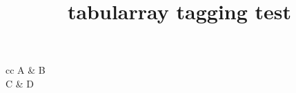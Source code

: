 \documentclass{article}
\title{tabularray tagging test}
\begin{document}
\begin{tblr}{cc}
A & B \\
C & D
\end{tblr}
\end{document}
